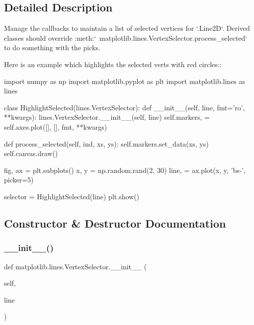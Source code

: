\subsection{Detailed Description}
\begin{DoxyVerb}Manage the callbacks to maintain a list of selected vertices for
`.Line2D`. Derived classes should override
:meth:`~matplotlib.lines.VertexSelector.process_selected` to do
something with the picks.

Here is an example which highlights the selected verts with red
circles::

    import numpy as np
    import matplotlib.pyplot as plt
    import matplotlib.lines as lines

    class HighlightSelected(lines.VertexSelector):
        def __init__(self, line, fmt='ro', **kwargs):
            lines.VertexSelector.__init__(self, line)
            self.markers, = self.axes.plot([], [], fmt, **kwargs)

        def process_selected(self, ind, xs, ys):
            self.markers.set_data(xs, ys)
            self.canvas.draw()

    fig, ax = plt.subplots()
    x, y = np.random.rand(2, 30)
    line, = ax.plot(x, y, 'bs-', picker=5)

    selector = HighlightSelected(line)
    plt.show()\end{DoxyVerb}
 

\subsection{Constructor \& Destructor Documentation}
\mbox{\label{classmatplotlib_1_1lines_1_1VertexSelector_a135457da4e0e253c2c0b94a8a9bbc220}} 
\subsubsection{\texorpdfstring{\+\_\+\+\_\+init\+\_\+\+\_\+()}{\_\_init\_\_()}}
{\footnotesize\ttfamily def matplotlib.\+lines.\+Vertex\+Selector.\+\_\+\+\_\+init\+\_\+\+\_\+ (\begin{DoxyParamCaption}\item[{}]{self,  }\item[{}]{line }\end{DoxyParamCaption})}

